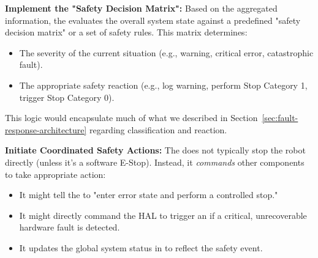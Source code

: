 \textbf{Implement the "Safety Decision Matrix":} Based on the aggregated information, the  evaluates the overall system state against a predefined "safety decision matrix" or a set of safety rules. This matrix determines:
        \begin{itemize}
            \item The severity of the current situation (e.g., warning, critical error, catastrophic fault).
            \item The appropriate safety reaction (e.g., log warning, perform Stop Category 1, trigger Stop Category 0).
        \end{itemize}
        This logic would encapsulate much of what we described in Section~\ref{sec:fault-response-architecture} %
        regarding classification and reaction.

\textbf{Initiate Coordinated Safety Actions:} The  does not typically stop the robot directly (unless it's a software E-Stop). Instead, it \textit{commands} other components to take appropriate action:
        \begin{itemize}
            \item It might tell the  to "enter error state and perform a controlled stop."
            \item It might directly command the HAL to trigger an  if a critical, unrecoverable hardware fault is detected.
            \item It updates the global system status in  to reflect the safety event.
        \end{itemize}


